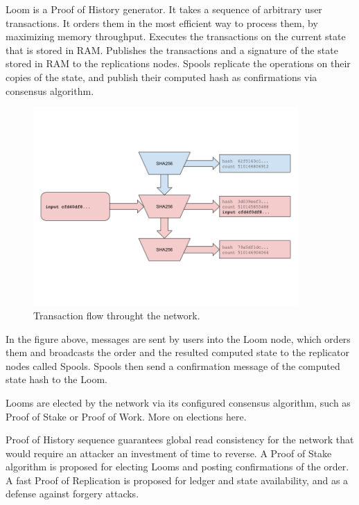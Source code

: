 \documentclass[12pt]{article}
\begin{document}
Loom is a Proof of History generator.  It takes a sequence of arbitrary user transactions.  It orders them in the most efficient way to process them, by maximizing memory throughput.  Executes the transactions on the current state that is stored in RAM.  Publishes the transactions and a signature of the state stored in RAM to the replications nodes.  Spools replicate the operations on their copies of the state, and publish their computed hash as confirmations via consensus algorithm.

\begin{figure}
  \begin{center}
    \centering
    \includegraphics[width=0.9\textwidth]{figures/fig_1.png}
    \caption[Fig 1]{Transaction flow throught the network.\label{fig_1}}
  \end{center}
  \end{figure}

In the figure above, messages are sent by users into the Loom node, which orders them and broadcasts the order and the resulted computed state to the replicator nodes called Spools.  Spools then send a confirmation message of the computed state hash to the Loom.

Looms are elected by the network via its configured consensus algorithm, such as Proof of Stake or Proof of Work.  More on elections here.

Proof of History sequence guarantees global read consistency for the network that would require an attacker an investment of time to reverse.  A Proof of Stake algorithm is proposed for electing Looms and posting confirmations of the order.  A fast Proof of Replication is proposed for ledger and state availability, and as a defense against forgery attacks.
\end{document}
